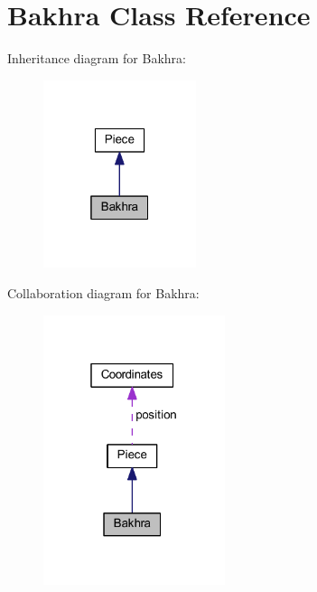\hypertarget{class_bakhra}{}\section{Bakhra Class Reference}
\label{class_bakhra}


Inheritance diagram for Bakhra\+:
\nopagebreak
\begin{figure}[H]
\begin{center}
\leavevmode
\includegraphics[width=127pt]{class_bakhra__inherit__graph}
\end{center}
\end{figure}


Collaboration diagram for Bakhra\+:
\nopagebreak
\begin{figure}[H]
\begin{center}
\leavevmode
\includegraphics[width=151pt]{class_bakhra__coll__graph}
\end{center}
\end{figure}
